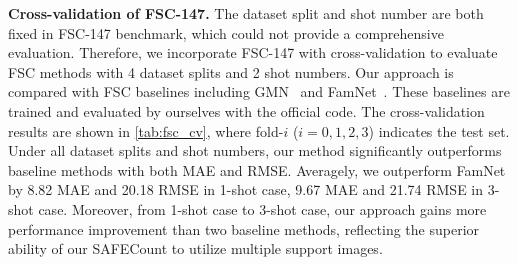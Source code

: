 \documentclass[10pt,twocolumn,letterpaper]{article}
\newcommand{\method}{SAFECount\xspace}
\begin{document}
\vspace{2pt}\noindent \textbf{Cross-validation of FSC-147.}  
The dataset split and shot number are both fixed in FSC-147 benchmark, which could not provide a comprehensive evaluation. 
Therefore, we incorporate FSC-147 with cross-validation to evaluate FSC methods with 4 dataset splits and 2 shot numbers. 
Our approach is compared with FSC baselines including GMN~\cite{gmn} and FamNet~\cite{famnet}. 
These baselines are trained and evaluated by ourselves with the official code. 
The cross-validation results are shown in \cref{tab:fsc_cv}, where fold-$i$ ($i=0,1,2,3$) indicates the test set. 
Under all dataset splits and shot numbers, our method significantly outperforms baseline methods with both MAE and RMSE. 
Averagely, we outperform FamNet by 8.82 MAE and 20.18 RMSE in 1-shot case, 9.67 MAE and 21.74 RMSE in 3-shot case. 
Moreover, from 1-shot case to 3-shot case, our approach gains more performance improvement than two baseline methods, reflecting the superior ability of our \method to utilize multiple support images. 
\end{document}
